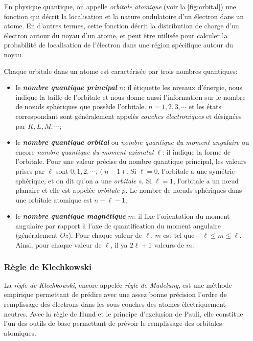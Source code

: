 \documentclass[12pt,a4paper]{article} %
\numberwithin{equation}{section} %
\numberwithin{figure}{section} %
\numberwithin{table}{section} %
\begin{document}
En physique quantique, on appelle \emph{orbitale atomique} (voir la \autoref{fig:orbital}) une fonction qui décrit la localisation et la nature ondulatoire d'un électron dans un atome. En d'autres termes, cette fonction décrit la distribution de charge d'un électron autour du noyau d'un atome, et peut être utilisée pour calculer la probabilité de localisation de l'électron dans une région spécifique autour du noyau.

Chaque orbitale dans un atome est caractérisée par trois nombres quantiques:
\begin{itemize}
 \item le \textbf{\emph{nombre quantique principal}} $n$: il étiquette les niveaux d'énergie, nous indique la taille de l'orbitale et nous donne aussi l'information sur le nombre de n{\oe}uds sphériques que possède l'orbitale. $n=1,2,3,\cdots$ et les états correspondant sont généralement appelés \emph{couches électroniques} et désignées par $K,L,M,\cdots$;

\item le \textbf{\emph{nombre quantique orbital}} ou \emph{nombre quantique du moment angulaire} ou encore  \emph{nombre quantique du moment azimutal}  $\ell$: il indique la forme de l'orbitale. Pour une valeur précise du nombre quantique principal, les valeurs prises par $\ell$ sont $0,1,2,\cdots,(n-1)$. Si $\ell=0$, l'orbitale a une symétrie sphérique, et on dit qu'on a une \emph{orbitale $s$}. Si $\ell=1$, l'orbitale a un n{\oe}ud planaire et elle est appelée \emph{orbitale $p$}. Le nombre de n{\oe}uds sphériques dans une orbitale atomique est $n-\ell-1$;

\item le \textbf{\emph{nombre quantique magnétique}} $m$: il fixe l'orientation du moment angulaire par rapport à l'axe de quantification du moment angulaire (généralement $Oz$). Pour chaque valeur de $\ell$, $m$ est tel que $-\ell\leq m\leq\ell$. Ainsi, pour chaque valeur de $\ell$, il ya $2\ell+1$ valeurs de $m$.
\end{itemize}


\subsubsection{Règle de Klechkowski}

La \emph{règle de Klechkowski}, encore appelée \emph{règle de Madelung}, est une méthode empirique permettant de prédire avec une assez bonne précision l'ordre de remplissage des électrons dans les sous-couches des atomes électriquement neutres. Avec la règle de Hund et le principe d'exclusion de Pauli, elle constitue l'un des outils de base permettant de prévoir le remplissage des orbitales atomiques.
\end{document}
